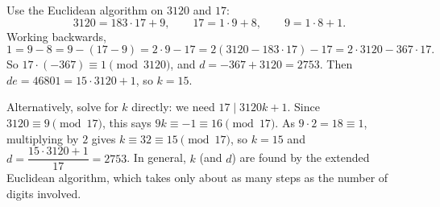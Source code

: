 Use the Euclidean algorithm on $3120$ and $17$:
\[
3120=183\cdot17+9,\qquad17=1\cdot9+8,\qquad9=1\cdot8+1 .
\]
Working backwards,
\[
1=9-8=9-(17-9)=2\cdot9-17=2(3120-183\cdot17)-17=2\cdot3120-367\cdot17 .
\]
So $17\cdot(-367)\equiv1\pmod{3120}$, and $d=-367+3120=\boxed{2753}$. Then $de=46801=15\cdot3120+1$, so $k=\boxed{15}$.

Alternatively, solve for $k$ directly: we need $17\mid3120k+1$. Since $3120\equiv9\pmod{17}$, this says $9k\equiv-1\equiv16\pmod{17}$. As $9\cdot2=18\equiv1$, multiplying by $2$ gives $k\equiv32\equiv15\pmod{17}$, so $k=15$ and $d=\dfrac{15\cdot3120+1}{17}=2753$. In general, $k$ (and $d$) are found by the extended Euclidean algorithm, which takes only about as many steps as the number of digits involved.
